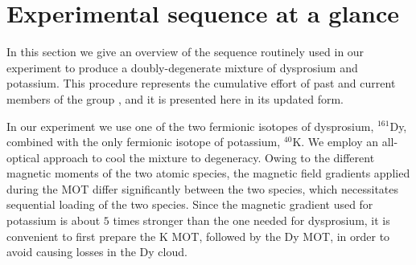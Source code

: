  \section{Experimental sequence at a glance}
 \label{Sec:ExpSeq}
 In this section we give an overview of the sequence routinely used in our experiment to produce a doubly-degenerate mixture of dysprosium and potassium. This procedure represents the cumulative effort of past and current members of the group \cite{Ravensbergen2018poa,Ravensbergen2020PhD, Tzanova2020PhD, Kreyer2017Master, Soave2022PhD}, and it is presented here in its updated form.
 
In our experiment we use one of the two fermionic isotopes of dysprosium, $^{161}$Dy, combined with the only fermionic isotope of potassium, $^{40}$K. We employ an {all-optical} approach to cool the mixture to degeneracy. Owing to the different magnetic moments of the two atomic species, the magnetic field gradients applied during the \ac{MOT} differ significantly between the two species, which necessitates sequential loading of the two species. Since the magnetic gradient used for potassium is about $5$ times stronger than the one needed for dysprosium, it is convenient to first prepare the K \ac{MOT}, followed by the Dy \ac{MOT}, in order to avoid causing losses in the Dy cloud. 

